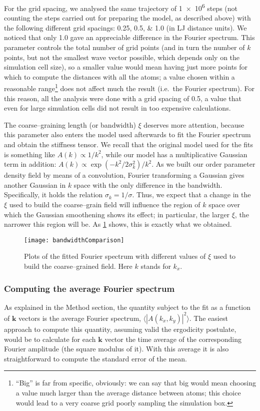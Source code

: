 For the grid spacing, we analysed the same trajectory of \num{1e6} steps (not counting the steps carried out for preparing the model, as described above) with the following different grid spacings: \numlist{0.25;0.5;1.0} (in LJ distance units). We noticed that only \num{1.0} gave an appreciable difference in the Fourier spectrum. This parameter controls the total number of grid points (and in turn the number of $k$ points, but not the smallest wave vector possible, which depends only on the simulation cell size), so a smaller value would mean having just more points for which to compute the distances with all the atoms; a value chosen within a reasonable range\footnote{``Big'' is far from specific, obviously: we can say that big would mean choosing a value much larger than the average distance between atoms; this choice would lead to a very coarse grid poorly sampling the simulation box.} does not affect much the result (i.e.\ the Fourier spectrum). For this reason, all the analysis were done with a grid spacing of \num{0.5}, a value that even for large simulation cells did not result in too expensive calculations.

The coarse--graining length (or bandwidth) $\xi$ deserves more attention, because this parameter also enters the model used afterwards to fit the Fourier spectrum and obtain the stiffness tensor.
We recall that the original model used for the fits is something like $A(k) \propto 1/k^2$, while our model has a multiplicative Gaussian term in addition: $A(k) \propto \exp{(-k^2/2\sigma_k^2)}/k^2$. As we built our order parameter density field by means of a convolution, Fourier transforming a Gaussian gives another Gaussian in $k$ space with the only difference in the bandwidth. Specifically, it holds the relation $\sigma_k = 1/\sigma$. Thus, we expect that a change in the $\xi$ used to build the coarse--grain field will influence the region of $k$ space over which the Gaussian smoothening shows its effect; in particular, the larger $\xi$, the narrower this region will be. As \cref{fig:bandwidths} shows, this is exactly what we obtained.
\begin{figure}[tb]
    \centering
    \texttt{[image: bandwidthComparison]}
    \caption{Plots of the fitted Fourier spectrum with different values of $\xi$ used to build the coarse--grained field. Here $k$ stands for $k_x$.}
    \label{fig:bandwidths}
\end{figure}


\subsubsection{Computing the average Fourier spectrum}
As explained in the Method section, the quantity subject to the fit as a function of $\bm{k}$ vectors is the average Fourier spectrum, $\langle |A(k_x,k_y)|^2 \rangle$. The easiest approach to compute this quantity, assuming valid the ergodicity postulate, would be to calculate for each $\bm{k}$ vector the time average of the corresponding Fourier amplitude (the square modulus of it). With this average it is also straightforward to compute the standard error of the mean.

